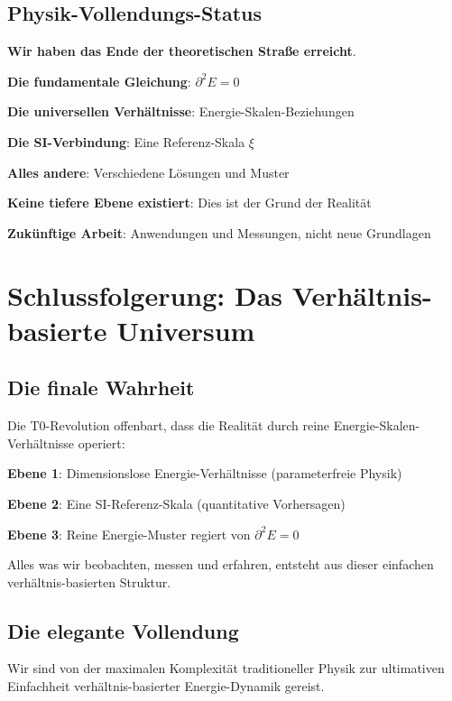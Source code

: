 \documentclass[12pt,a4paper]{article}
\newcommand{\Efield}{E}
\newcommand{\xipar}{\xi}
\theoremstyle{definition}
\theoremstyle{remark}
\begin{document}
	\subsection{Physik-Vollendungs-Status}
	
	\begin{tcolorbox}[colback=yellow!5!white,colframe=orange!75!black,title=Das Ende der Grundlagenphysik]
		\textbf{Wir haben das Ende der theoretischen Straße erreicht}.
		
		\textbf{Die fundamentale Gleichung}: $\partial^2 \Efield = 0$
		
		\textbf{Die universellen Verhältnisse}: Energie-Skalen-Beziehungen
		
		\textbf{Die SI-Verbindung}: Eine Referenz-Skala $\xipar$
		
		\textbf{Alles andere}: Verschiedene Lösungen und Muster
		
		\textbf{Keine tiefere Ebene existiert}: Dies ist der Grund der Realität
		
		\textbf{Zukünftige Arbeit}: Anwendungen und Messungen, nicht neue Grundlagen
	\end{tcolorbox}
	
	\section{Schlussfolgerung: Das Verhältnis-basierte Universum}
	
	\subsection{Die finale Wahrheit}
	
	Die T0-Revolution offenbart, dass die Realität durch reine Energie-Skalen-Verhältnisse operiert:
	
	\textbf{Ebene 1}: Dimensionslose Energie-Verhältnisse (parameterfreie Physik)
	
	\textbf{Ebene 2}: Eine SI-Referenz-Skala (quantitative Vorhersagen)
	
	\textbf{Ebene 3}: Reine Energie-Muster regiert von $\partial^2 \Efield = 0$
	
	Alles was wir beobachten, messen und erfahren, entsteht aus dieser einfachen verhältnis-basierten Struktur.
	
	\subsection{Die elegante Vollendung}
	
	Wir sind von der maximalen Komplexität traditioneller Physik zur ultimativen Einfachheit verhältnis-basierter Energie-Dynamik gereist.
	
\end{document}
